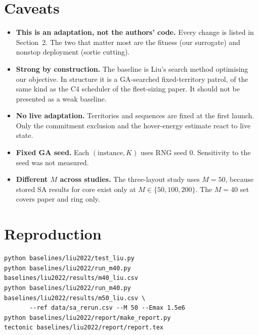\documentclass[10pt,a4paper]{article}
\begin{document}
\section{Caveats}
\begin{itemize}
\item \textbf{This is an adaptation, not the authors' code.} Every change is listed in Section~2. The two
  that matter most are the fitness (our surrogate) and nonstop deployment (sortie cutting).
\item \textbf{Strong by construction.} The baseline is Liu's search method optimising our objective. In
  structure it is a GA-searched fixed-territory patrol, of the same kind as the C4 scheduler of the
  fleet-sizing paper. It should not be presented as a weak baseline.
\item \textbf{No live adaptation.} Territories and sequences are fixed at the first launch. Only the
  commitment exclusion and the hover-energy estimate react to live state.
\item \textbf{Fixed GA seed.} Each $(\text{instance},K)$ uses RNG seed 0. Sensitivity to the seed was not
  measured.
\item \textbf{Different $M$ across studies.} The three-layout study uses $M=50$, because stored SA results
  for core exist only at $M\in\{50,100,200\}$. The $M=40$ set covers paper and ring only.
\end{itemize}

\section{Reproduction}
\begin{verbatim}
python baselines/liu2022/test_liu.py
python baselines/liu2022/run_m40.py baselines/liu2022/results/m40_liu.csv
python baselines/liu2022/run_m40.py baselines/liu2022/results/m50_liu.csv \
       --ref data/sa_rerun.csv --M 50 --Emax 1.5e6
python baselines/liu2022/report/make_report.py
tectonic baselines/liu2022/report/report.tex
\end{verbatim}
\end{document}
